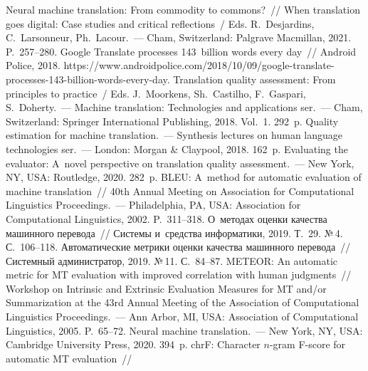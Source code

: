\begin{multicols}{2}
{\small\frenchspacing
{%
\begin{thebibliography}{99}
 Neural machine translation: From commodity to commons?~//
 When  translation goes digital: Case studies and critical reflections~/ Eds. R.~Desjardins, 
C.~Larsonneur, Ph.~Lacour.~--- Cham, Switzerland: Palgrave Macmillan, 2021. P.~257--280.
 Google Translate processes 143~billion words every day~// Android Police, 
2018. {\sf https://\linebreak www.androidpolice.com/2018/10/09/google-translate- processes-143-billion-words-every-day}.
Translation quality assessment: From principles to practice~/ Eds. J.~Moorkens, 
Sh.~Castilho, F.~Gaspari, S.~Doherty.~--- Machine translation: Technologies and applications ser.~---
Cham, Switzerland: Springer International Publishing,  2018. 
Vol.~1. 292~p.
 Quality estimation for machine translation.~--- Synthesis lectures on
human language technologies ser.~--- London: Morgan \& Claypool, 2018. 162~p.
 Evaluating the evaluator: A~novel perspective on translation quality 
assessment.~--- New York, NY, USA: Routledge, 2020. 282~p.
 BLEU: A~method for automatic evaluation of 
machine translation~// 40th Annual Meeting on Association for Computational Linguistics 
Proceedings.~--- Philadelphia, PA, USA: Association for Computational Linguistics, 2002. 
P.~311--318.
 О~методах оценки качества машинного перевода~// Системы 
и~средства информатики, 2019. Т.~29. №\,4. С.~106--118.
 Автоматические метрики оценки качества 
машинного перевода~// Системный администратор, 2019. №\,11. С.~84--87.
 METEOR: An automatic metric for MT evaluation with improved 
correlation with human judgments~// Workshop on Intrinsic and Extrinsic 
Evaluation Measures for MT and/or Summarization at the 43rd Annual Meeting of the 
Association of Computational Linguistics Proceedings.~---
 Ann Arbor, MI, USA: Association of 
Computational Linguistics, 2005. P.~65--72.
 Neural machine translation.~--- New York, NY, USA: Cambridge University 
Press, 2020. 394~p.
 chrF: Character $n$-gram F-score for automatic MT evaluation~//  

\end{thebibliography}}}
\end{multicols}
